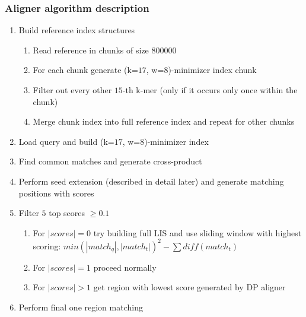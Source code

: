 \begin{frame}
  \frametitle{Aligner algorithm description}
  \scriptsize
  \begin{enumerate}
    \item Build reference index structures
    \begin{enumerate}
      \scriptsize
      \item Read reference in chunks of size $800000$
      \item For each chunk generate (k=$17$, w=$8$)-minimizer index chunk
      \item Filter out every other $15$-th k-mer (only if it occurs only once within the chunk)
      \item Merge chunk index into full reference index and repeat for other chunks
    \end{enumerate}
    \item Load query and build (k=$17$, w=$8$)-minimizer index
    \item Find common matches and generate cross-product
    \item Perform seed extension (described in detail later) and generate matching positions with scores
    \item Filter $5$ top scores $\geq 0.1$
    \begin{enumerate}
        \scriptsize
        \item For $|scores| = 0$ try building full LIS and use sliding window with highest scoring: $min(|match_q|, |match_t|)^2 - \sum {diff(match_t)}$
        \item For $|scores| = 1$ proceed normally
        \item For $|scores| > 1$ get region with lowest score generated by DP aligner
    \end{enumerate}
    \item Perform final one region matching
  \end{enumerate}

\end{frame}


